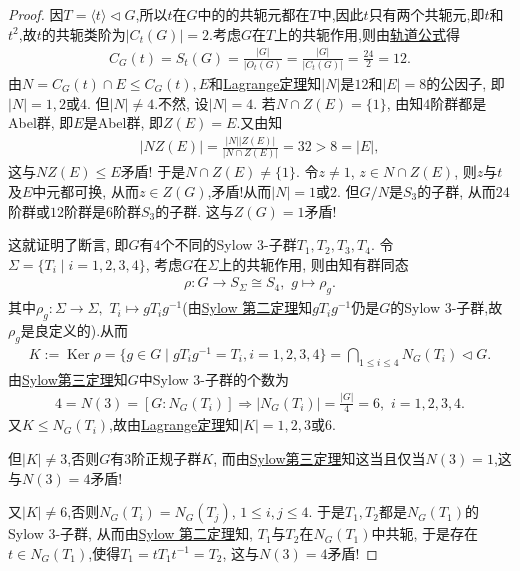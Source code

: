 \documentclass[../../main.tex]{subfiles}%
\begin{document}
\begin{proof}
因$T=\langle t \rangle\lhd G$,所以$t$在$G$中的的共轭元都在$T$中,因此$t$只有两个共轭元,即$t$和$t^2$,故$t$的共轭类阶为$|C_t(G)|=2$.考虑$G$在$T$上的共轭作用,则由\hyperref[corollary:有限群轨道的阶与其商掉迷向子群的阶相同]{轨道公式}得
\begin{align*}
C_G(t)=S_t(G)=\frac{|G|}{|O_t(G)}=\frac{|G|}{|C_t(G)|}=\frac{24}{2}=12.
\end{align*}
由$N=C_G(t)\cap E\leqslant C_G(t),E$和\hyperref[theorem:抽象代数--Lagrange定理]{Lagrange定理}知$|N|$是$12$和$|E|=8$的公因子, 即$|N|=1,2$或$4$. 但$|N| \neq 4$.不然, 设$|N|=4$. 若$N \cap Z(E)=\{1\}$, 由知$4$阶群都是Abel群, 即$E$是Abel群, 即$Z(E)=E$.又由知
\begin{align*}
|NZ(E)|=\frac{|N||Z(E)|}{|N\cap Z(E)|}=32> 8=|E|,
\end{align*}
这与$NZ(E)\leqslant E$矛盾! 于是$N \cap Z(E) \neq \{1\}$. 令$z \neq 1$, $z \in N \cap Z(E)$, 则$z$与$t$及$E$中元都可换, 从而$z \in Z(G)$,矛盾!从而$|N|=1$或$2$. 但$G/N$是$S_3$的子群, 从而$24$阶群或$12$阶群是$6$阶群$S_3$的子群. 这与$Z(G)=1$矛盾!

这就证明了断言, 即$G$有$4$个不同的Sylow 3-子群$T_1, T_2, T_3, T_4$. 令$\Sigma = \{T_i \mid i=1,2,3,4\}$, 考虑$G$在$\Sigma$上的共轭作用, 则由知有群同态
\begin{align*}
\rho: G \to S_\Sigma\cong S_4,\,\,g\mapsto \rho_g.
\end{align*}
其中$\rho_g:\Sigma\to \Sigma,\,\,T_i\mapsto gT_ig^{-1}$(由\hyperref[theorem:Sylow 第二定理]{Sylow 第二定理}知$gT_ig^{-1}$仍是$G$的Sylow 3-子群,故$\rho_g$是良定义的).从而
\begin{align*}
K:=\operatorname{Ker} \rho = \{g \in G \mid gT_i g^{-1} = T_i, i=1,2,3,4\} 
= \bigcap\limits_{1 \leqslant i \leqslant 4} N_G(T_i) \lhd G.
\end{align*}
由\hyperref[theorem:Sylow第三定理]{Sylow第三定理}知$G$中Sylow 3-子群的个数为
\begin{align*}
4=N(3)=[G:N_G(T_i)]\Longrightarrow |N_G(T_i)|=\frac{|G|}{4}=6,\,\,i=1,2,3,4.
\end{align*}
又$K\leqslant N_G(T_i)$,故由\hyperref[theorem:抽象代数--Lagrange定理]{Lagrange定理}知$|K|=1,2,3$或$6$.

但$|K| \neq 3$,否则$G$有$3$阶正规子群$K$, 而由\hyperref[theorem:Sylow第三定理]{Sylow第三定理}知这当且仅当$N(3)=1$,这与$N(3)=4$矛盾!

又$|K| \neq 6$,否则$N_G(T_i)=N_G(T_j)$, $1 \leqslant i,j \leqslant 4$. 于是$T_1, T_2$都是$N_G(T_1)$的Sylow 3-子群, 从而由\hyperref[theorem:Sylow 第二定理]{Sylow 第二定理}知, $T_1$与$T_2$在$N_G(T_1)$中共轭, 于是存在$t\in N_G(T_1)$,使得$T_1=tT_1t^{-1}=T_2$, 这与$N(3)=4$矛盾!


\end{proof}
\end{document}
